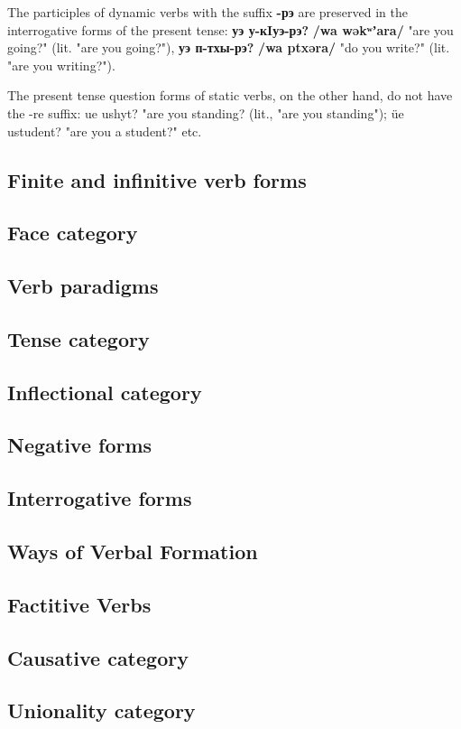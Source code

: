 \documentclass[a4paper,12pt]{book}
\newcommand{\1}[1]{\textbf{\emph{#1}}} %
\newcommand{\2}[1]{\textbf{[#1]}} %
\newcommand{\3}[1]{\fontsize{11pt}{0cm}\textbf{\emph{#1}}} %
\newcommand{\4}[1]{\fontsize{10pt}{0cm}\emph{#1}}	%
\newcommand{\5}[1]{\textbf{/#1/}} %
\newcommand{\6}[1]{\textbf{[#1]}} %
\newcommand{\7}[1]{\fontsize{12pt}{0cm}\emph{#1}} %
\newcommand{\8}[1]{\fontsize{12pt}{0cm}`#1'} %
\newcommand{\9}[1]{\fontsize{12pt}{0cm}(lit. `#1')} %
\newcommand{\glossphonemics}[1]{\textbf{/#1/}} %
\begin{document}
\begin{xlist}
The participles of dynamic verbs with the suffix \textbf{-рэ} are preserved in the interrogative forms of the present tense: \textbf{уэ у-кIуэ-рэ?} \glossphonemics{wa wəkʷʼara} "are you going?" (lit. "are you going?"), \textbf{уэ п-тхы-рэ?} \glossphonemics{wa ptxəra} "do you write?" (lit. "are you writing?").

The present tense question forms of static verbs, on the other hand, do not have the -re suffix: ue ushyt? "are you standing? (lit., "are you standing"); üe ustudent? "are you a student?" etc.
\end{xlist}

\subsection{Finite and infinitive verb forms}
\subsection{Face category}
\subsection{Verb paradigms}
\subsection{Tense category}
\subsection{Inflectional category}
\subsection{Negative forms}
\subsection{Interrogative forms}
\subsection{Ways of Verbal Formation}
\subsection{Factitive Verbs}
\subsection{Causative category}
\subsection{Unionality category}
\end{document}
